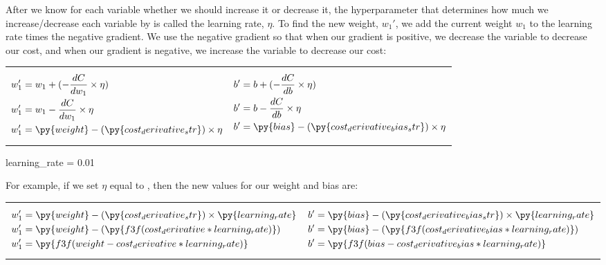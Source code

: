 \documentclass[12pt]{article}
\begin{document}
After we know for each variable whether we should increase it or decrease it, the hyperparameter that determines how much we increase/decrease each variable by is called the learning rate, $\eta$. To find the new weight, $w_1'$, we add the current weight $w_1$ to the learning rate times the negative gradient. We use the negative gradient so that when our gradient is positive, we decrease the variable to decrease our cost, and when our gradient is negative, we increase the variable to decrease our cost:
{
\setlength{\abovedisplayskip}{0pt}
\setlength{\belowdisplayskip}{0pt}
\begin{center}
	\noindent\begin{tabularx}{0.8\linewidth}{X X}
		\vbox{
			\begin{align*}
				w_1' & = w_1 + (-\frac{dC}{dw_1} \times \eta)
				\\
				w_1' & = w_1 - \frac{dC}{dw_1} \times \eta
				\\
				w_1' & = \py{weight} - (\py{cost_derivative_str}) \times \eta
			\end{align*}
		}
		 &
		\vbox{
			\begin{align*}
				b' & = b + (-\frac{dC}{db} \times \eta)
				\\
				b' & = b - \frac{dC}{db} \times \eta
				\\
				b' & = \py{bias} - (\py{cost_derivative_bias_str}) \times \eta
			\end{align*}
		}
	\end{tabularx}
\end{center}
}

\begin{pycode}
learning_rate = 0.01
\end{pycode}

{
\setlength{\abovedisplayskip}{0pt}
\setlength{\belowdisplayskip}{0pt}
For example, if we set $\eta$ equal to , then the new values for our weight and bias are:
\begin{center}
	\begin{tabularx}{0.8\linewidth}{X X}
		\vbox{
			\begin{align*}
				w_1' & = \py{weight} - (\py{cost_derivative_str}) \times \py{learning_rate}
				\\
				w_1' & = \py{weight} - (\py{f3f(cost_derivative * learning_rate)})
				\\
				w_1' & = \py{f3f(weight - cost_derivative * learning_rate)}
			\end{align*}
		} &
		\vbox{
			\begin{align*}
				b' & = \py{bias} - (\py{cost_derivative_bias_str}) \times \py{learning_rate}
				\\
				b' & = \py{bias} - (\py{f3f(cost_derivative_bias * learning_rate)})
				\\
				b' & = \py{f3f(bias - cost_derivative_bias * learning_rate)}
			\end{align*}
		}
	\end{tabularx}
\end{center}
}
\end{document}
